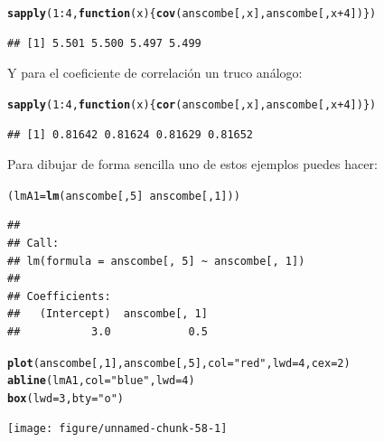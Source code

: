 \documentclass[10pt,a4paper]{article}\usepackage[]{graphicx}\usepackage[]{color}
\makeatletter
\newcommand{\hlnum}[1]{\textcolor[rgb]{0.686,0.059,0.569}{#1}}%
\newcommand{\hlstr}[1]{\textcolor[rgb]{0.192,0.494,0.8}{#1}}%
\newcommand{\hlopt}[1]{\textcolor[rgb]{0,0,0}{#1}}%
\newcommand{\hlstd}[1]{\textcolor[rgb]{0.345,0.345,0.345}{#1}}%
\newcommand{\hlkwa}[1]{\textcolor[rgb]{0.161,0.373,0.58}{\textbf{#1}}}%
\newcommand{\hlkwb}[1]{\textcolor[rgb]{0.69,0.353,0.396}{#1}}%
\newcommand{\hlkwc}[1]{\textcolor[rgb]{0.333,0.667,0.333}{#1}}%
\newcommand{\hlkwd}[1]{\textcolor[rgb]{0.737,0.353,0.396}{\textbf{#1}}}%
\newenvironment{kframe}{%
 \def\at@end@of@kframe{}%
 \ifinner\ifhmode%
  \def\at@end@of@kframe{\end{minipage}}%
  \begin{minipage}{\columnwidth}%
 \fi\fi%
 \def\FrameCommand##1{\hskip\@totalleftmargin \hskip-\fboxsep
 \colorbox{shadecolor}{##1}\hskip-\fboxsep
     \hskip-\linewidth \hskip-\@totalleftmargin \hskip\columnwidth}%
 \MakeFramed {\advance\hsize-\width
   \@totalleftmargin\z@ \linewidth\hsize
   \@setminipage}}%
 {\par\unskip\endMakeFramed%
 \at@end@of@kframe}
\newenvironment{knitrout}{}{} %
\makeatother
\begin{document}
\begin{knitrout}
\color{fgcolor}\begin{kframe}
\begin{alltt}
\hlkwd{sapply}\hlstd{(}\hlnum{1}\hlopt{:}\hlnum{4}\hlstd{,} \hlkwa{function}\hlstd{(}\hlkwc{x}\hlstd{)\{}\hlkwd{cov}\hlstd{(anscombe[ ,x], anscombe[ , x} \hlopt{+} \hlnum{4}\hlstd{])\})}
\end{alltt}
\begin{verbatim}
## [1] 5.501 5.500 5.497 5.499
\end{verbatim}
\end{kframe}
\end{knitrout}
Y para el coeficiente de correlación un truco análogo:
\begin{knitrout}
\color{fgcolor}\begin{kframe}
\begin{alltt}
\hlkwd{sapply}\hlstd{(}\hlnum{1}\hlopt{:}\hlnum{4}\hlstd{,} \hlkwa{function}\hlstd{(}\hlkwc{x}\hlstd{)\{}\hlkwd{cor}\hlstd{(anscombe[ ,x], anscombe[ , x} \hlopt{+} \hlnum{4}\hlstd{])\})}
\end{alltt}
\begin{verbatim}
## [1] 0.81642 0.81624 0.81629 0.81652
\end{verbatim}
\end{kframe}
\end{knitrout}
Para dibujar de forma sencilla uno de estos ejemplos puedes hacer:
\begin{knitrout}
\color{fgcolor}\begin{kframe}
\begin{alltt}
\hlstd{(lmA1}\hlkwb{=}\hlkwd{lm}\hlstd{(anscombe[,} \hlnum{5}\hlstd{]} \hlopt{~} \hlstd{anscombe[ ,} \hlnum{1}\hlstd{]))}
\end{alltt}
\begin{verbatim}
## 
## Call:
## lm(formula = anscombe[, 5] ~ anscombe[, 1])
## 
## Coefficients:
##   (Intercept)  anscombe[, 1]  
##           3.0            0.5
\end{verbatim}
\begin{alltt}
\hlkwd{plot}\hlstd{(anscombe[ ,} \hlnum{1}\hlstd{], anscombe[ ,} \hlnum{5}\hlstd{],} \hlkwc{col}\hlstd{=}\hlstr{"red"}\hlstd{,} \hlkwc{lwd}\hlstd{=}\hlnum{4}\hlstd{,} \hlkwc{cex}\hlstd{=}\hlnum{2}\hlstd{)}
\hlkwd{abline}\hlstd{(lmA1,} \hlkwc{col}\hlstd{=}\hlstr{"blue"}\hlstd{,} \hlkwc{lwd}\hlstd{=}\hlnum{4}\hlstd{)}
\hlkwd{box}\hlstd{(}\hlkwc{lwd}\hlstd{=}\hlnum{3}\hlstd{,}\hlkwc{bty}\hlstd{=}\hlstr{"o"}\hlstd{)}
\end{alltt}
\end{kframe}

{\centering \texttt{[image: figure/unnamed-chunk-58-1]} 

}



\end{knitrout}
\end{document}
